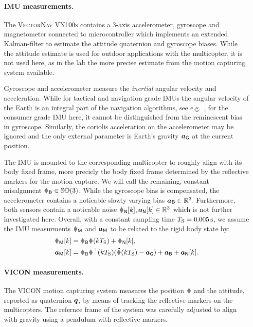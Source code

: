 \paragraph{IMU measurements.}
The \textsc{VectorNav VN100s} contains a 3-axis accelerometer, gyroscope and magnetometer connected to microcontroller which implements an extended Kalman-filter to estimate the attitude quaternion and gyroscope biases.
While the attitude estimate is used for outdoor applications with the multicopter, it is not used here, as in the lab the more precise estimate from the motion capturing system available.

Gyroscope and accelerometer measure the \textit{inertial} angular velocity and acceleration.
While for tactical and navigation grade IMUs the angular velocity of the Earth is an integral part of the navigation algorithms, see e.g.\ \cite{Savage:Strapdown1}, for the consumer grade IMU here, it cannot be distinguished from the reminescent bias in gyroscope.
Similarly, the coriolis acceleration on the accelerometer may be ignored and the only external parameter is Earth's gravity $\boldsymbol{a}_{\mathsf{G}}$ at the current position.

The IMU is mounted to the corresponding multicopter to roughly align with its body fixed frame, more precicly the body fixed frame determined by the reflective markers for the motion capture.
We will call the remaining, constant misalgnment $\RIMUBR \in \SpecialOrthogonalGroup(3)$.
While the gyroscope bias is compensated, the accelerometer contains a noticable slowly varying bias $\boldsymbol{a}_{\mathsf{B}} \in \mathbb{R}^3$.
Furthermore, both sensors contain a noticable noise $\wIMUN[k], \aIMUN[k] \in \RealNum^3$ which is not further investigated here.
Overall, with a constant sampling time $T_{\mathrm{S}}=0.005\,\text{s}$, we assume the IMU measurments $\wIMU$ and $\boldsymbol{a}_{\mathsf{M}}$ to be related to the rigid body state by:
\begin{align}
 \wIMU[k] &= \RIMUBR \w(k\Ts) + \wIMUN[k],
\\
 \aIMU[k] &=  \RIMUBR \R^\top(k\Ts) (\rdd(k\Ts) - \gravityAcc) + \aIMUB + \aIMUN[k]
 .
\end{align}

\paragraph{VICON measurements.}
The \textsc{VICON} motion capturing system measures the position $\r$ and the attitude, reported as quaternion $\boldsymbol{q}$, by means of tracking the reflective markers on the multicopters.
The refernce frame of the system was carefully adjusted to align with gravity using a pendulum with reflective markers.

